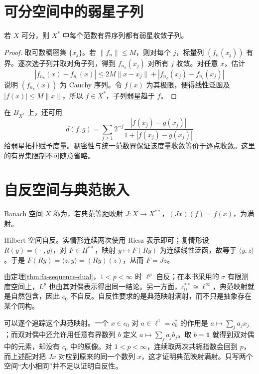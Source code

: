 \documentclass[UTF8,12pt,a4paper,fontset=fandol]{ctexbook}
\begin{document}
\section{可分空间中的弱星子列}
\begin{theorem}\label{thm:fa-weak-star-subsequence}
若 $X$ 可分，则 $X^*$ 中每个范数有界序列都有弱星收敛子列。
\end{theorem}
\begin{proof}
取可数稠密集 $\{x_j\}$。若 $\|f_n\|\leq M$，则对每个 $j$，标量列 $(f_n(x_j))$ 有界。逐次选子列并取对角子列，得到 $f_{n_k}(x_j)$ 对所有 $j$ 收敛。对任意 $x$，估计
\[
 |f_{n_k}(x)-f_{n_l}(x)|\leq2M\|x-x_j\|
       +|f_{n_k}(x_j)-f_{n_l}(x_j)|
\]
说明 $(f_{n_k}(x))$ 为 Cauchy 序列。令 $f(x)$ 为其极限，便得线性泛函及 $|f(x)|\leq M\|x\|$，所以 $f\in X^*$，子列弱星趋于 $f$。
\end{proof}
在 $B_{X^*}$ 上，还可用
\[
 d(f,g)=\sum_{j\geq1}2^{-j}\frac{|f(x_j)-g(x_j)|}{1+|f(x_j)-g(x_j)|}
\]
给弱星拓扑赋予度量。稠密性与统一范数界保证该度量收敛等价于逐点收敛。这里的有界集限制不可随意省略。

\section{自反空间与典范嵌入}
\begin{definition}
Banach 空间 $X$ 称为，若典范等距映射 $J:X\to X^{**}$，$(Jx)(f)=f(x)$，为满射。
\end{definition}
Hilbert 空间自反。实情形连续两次使用 Riesz 表示即可；复情形设 $R(y)=\langle\,\cdot\,,y\rangle$，对 $F\in H^{**}$，映射 $y\mapsto\overline{F(Ry)}$ 为连续线性泛函，故等于 $\langle y,z\rangle$。于是 $F(Ry)=\langle z,y\rangle=(Ry)(z)$，从而 $F=Jz$。

由定理\ref{thm:fa-sequence-dual}，$1<p<\infty$ 时 $\ell^p$ 自反；在本书采用的 $\sigma$ 有限测度空间上，$L^p$ 也由其对偶表示得出同一结论。另一方面，$c_0^{**}\cong\ell^\infty$，典范映射就是自然包含，因此 $c_0$ 不自反。自反性要求的是典范映射满射，而不只是抽象存在某个同构。

可以逐个追踪这个典范映射。一个 $x\in c_0$ 对 $a\in\ell^1=c_0^*$ 的作用是 $a\mapsto\sum_ja_jx_j$；而双对偶中还允许用任意有界数列 $b$ 定义 $a\mapsto\sum_ja_jb_j$。取 $b=\boldsymbol1$ 就得到双对偶中的元素，却没有 $c_0$ 中的原像。对 $1<p<\infty$，连续取两次共轭指数会回到 $p$，而上述配对把 $Jx$ 对应到原来的同一个数列 $x$，这才证明典范映射满射。只写两个空间“大小相同”并不足以证明自反性。
\end{document}
